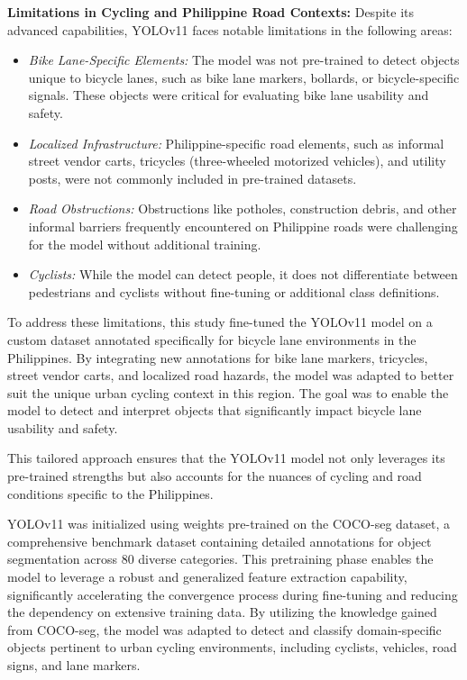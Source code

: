 \textbf{Limitations in Cycling and Philippine Road Contexts:} 
Despite its advanced capabilities, YOLOv11 faces notable limitations in the following areas:
\begin{itemize}
    \item \textit{Bike Lane-Specific Elements:} The model was not pre-trained to detect objects unique to bicycle lanes, such as bike lane markers, bollards, or bicycle-specific signals. These objects were critical for evaluating bike lane usability and safety.
    \item \textit{Localized Infrastructure:} Philippine-specific road elements, such as informal street vendor carts, tricycles (three-wheeled motorized vehicles), and utility posts, were not commonly included in pre-trained datasets.
    \item \textit{Road Obstructions:} Obstructions like potholes, construction debris, and other informal barriers frequently encountered on Philippine roads were challenging for the model without additional training.
    \item \textit{Cyclists:} While the model can detect people, it does not differentiate between pedestrians and cyclists without fine-tuning or additional class definitions.
\end{itemize}

To address these limitations, this study fine-tuned the YOLOv11 model on a custom dataset annotated specifically for bicycle lane environments in the Philippines. By integrating new annotations for bike lane markers, tricycles, street vendor carts, and localized road hazards, the model was adapted to better suit the unique urban cycling context in this region. The goal was to enable the model to detect and interpret objects that significantly impact bicycle lane usability and safety.

This tailored approach ensures that the YOLOv11 model not only leverages its pre-trained strengths but also accounts for the nuances of cycling and road conditions specific to the Philippines.

YOLOv11 was initialized using weights pre-trained on the COCO-seg dataset, a comprehensive benchmark dataset containing detailed annotations for object segmentation across 80 diverse categories. This pretraining phase enables the model to leverage a robust and generalized feature extraction capability, significantly accelerating the convergence process during fine-tuning and reducing the dependency on extensive training data. By utilizing the knowledge gained from COCO-seg, the model was adapted to detect and classify domain-specific objects pertinent to urban cycling environments, including cyclists, vehicles, road signs, and lane markers.

